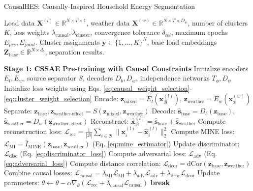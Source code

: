 \documentclass[journal]{IEEEtran}
\begin{document}
\begin{algorithm}[h!]
\caption{CausalHES: Causally-Inspired Household Energy Segmentation}
\label{alg:causal_hes_training}
\begin{algorithmic}[1]
\REQUIRE Load data $\mathbf{X}^{(l)} \in \mathbb{R}^{N \times T \times 1}$, weather data $\mathbf{X}^{(w)} \in \mathbb{R}^{N \times T \times D_w}$, number of clusters $K$, loss weights $\lambda_{\text{causal}}, \lambda_{\text{cluster}}$, convergence tolerance $\delta_{tol}$, maximum epochs $E_{pre}, E_{joint}$.
\ENSURE Cluster assignments $\mathbf{y} \in \{1, \ldots, K\}^N$, base load embeddings $\mathbf{Z}_{\text{base}} \in \mathbb{R}^{N \times d_b}$, separation results.

\STATE \textbf{Stage 1: CSSAE Pre-training with Causal Constraints}
\STATE Initialize encoders $E_l, E_w$, source separator $S$, decoders $D_b, D_w$, independence networks $T_\phi, D_\psi$
\STATE Initialize loss weights using Eqs. \ref{eq:causal_weight_selection}-\ref{eq:cluster_weight_selection}
        \STATE Encode: $\mathbf{z}_{\text{mixed}} = E_l(\mathbf{x}_{\mathcal{B}}^{(l)})$, $\mathbf{z}_{\text{weather}} = E_w(\mathbf{x}_{\mathcal{B}}^{(w)})$
        \STATE Separate: $\mathbf{z}_{\text{base}}, \mathbf{z}_{\text{weather-effect}} = S(\mathbf{z}_{\text{mixed}}, \mathbf{z}_{\text{weather}})$
        \STATE Decode: $\hat{\mathbf{s}}_{\text{base}} = D_b(\mathbf{z}_{\text{base}})$, $\hat{\mathbf{s}}_{\text{weather}} = D_w(\mathbf{z}_{\text{weather-effect}})$
        \STATE Reconstruct: $\hat{\mathbf{x}}_{\mathcal{B}}^{(l)} = \hat{\mathbf{s}}_{\text{base}} + \hat{\mathbf{s}}_{\text{weather}}$
        \STATE Compute reconstruction loss: $\mathcal{L}_{\text{rec}} = \frac{1}{|\mathcal{B}|} \sum_{i \in \mathcal{B}} \|\mathbf{x}_i^{(l)} - \hat{\mathbf{x}}_i^{(l)}\|_2^2$
        \STATE Compute MINE loss: $\mathcal{L}_{\text{MI}} = \hat{I}_{\text{MINE}}(\mathbf{z}_{\text{base}}, \mathbf{z}_{\text{weather}})$ (Eq. \ref{eq:mine_estimator})
        \STATE Update discriminator: $\mathcal{L}_{\text{disc}}$ (Eq. \ref{eq:discriminator_loss})
        \STATE Compute adversarial loss: $\mathcal{L}_{\text{adv}}$ (Eq. \ref{eq:adversarial_loss})
        \STATE Compute distance correlation: $\mathcal{L}_{\text{dcor}} = \text{dCor}(\mathbf{z}_{\text{base}}, \mathbf{z}_{\text{weather}})$
        \STATE Combine causal losses: $\mathcal{L}_{\text{causal}} = \lambda_{\text{MI}} \mathcal{L}_{\text{MI}} + \lambda_{\text{adv}} \mathcal{L}_{\text{adv}} + \lambda_{\text{dcor}} \mathcal{L}_{\text{dcor}}$
        \STATE Update parameters: $\theta \leftarrow \theta - \alpha \nabla_\theta (\mathcal{L}_{\text{rec}} + \lambda_{\text{causal}} \mathcal{L}_{\text{causal}})$
    \ENDFOR
        \STATE \textbf{break}
    \ENDIF
\ENDFOR


\end{algorithmic}
\end{algorithm}
\end{document}

